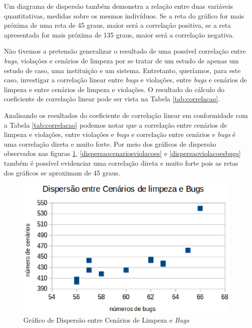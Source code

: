 Um diagrama de dispersão também demonstra a relação entre duas variáveis quantitativas, medidas sobre os mesmos indivíduos. Se a reta do gráfico for mais próxima de
uma reta de 45 graus, maior será a correlação positiva, se a reta apresentada for mais próxima de 135 graus, maior será a correlação negativa. 

Não tivemos a pretensão generalizar o resultado de uma possível correlação entre \textit{bugs}, violações e cenários de limpeza por se tratar de um estudo de apenas um estudo de caso, uma instituição e um sistema. Entretanto, queríamos, para este caso, investigar a  correlação linear entre \textit{bugs} e violações, entre \textit{bugs} e cenários de limpeza e entre cenários de limpeza e violações. O resultado do cálculo do coeficiente de correlação linear pode ser vista na Tabela \ref{tab:correlacao}.


\begin{table}[H]

\end{table}
\FloatBarrier

Analisando os resultados do coeficiente de correlação linear em conformidade com a Tabela \ref{tab:correlacao} podemos notar que a correlação entre cenários de limpeza e violações, entre violações e \textit{bugs} e correlação entre cenários e \textit{bugs} é uma correlação direta e muito forte. Por meio dos gráficos de dispersão observados nas figuras \ref{dispercaocenariosbugs}, \ref{dispersaocenariosviolacoes} e \ref{dispersaoviolacoesbugs} também é possível evidenciar uma correlação direta e muito forte pois as retas dos gráficos se aproximam de 45 graus.

\begin{figure}[H]
\centering
\includegraphics[keepaspectratio=false,scale=0.7]{figuras/figuras_nilton/dispercaocenariosbugs.eps}
\caption{Gráfico de Dispersão entre Cenários de Limpeza e \textit{Bugs}}
\label{dispercaocenariosbugs}
\end{figure}


